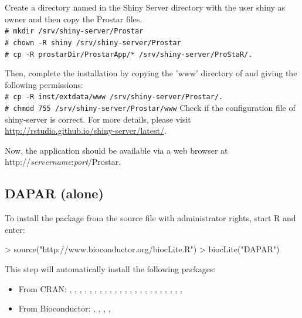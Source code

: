 \documentclass[12pt]{article}
\newcommand{\shellcmd}[1]{\\\indent\indent\texttt{\footnotesize\# #1}}
\begin{document}
Create a directory named  in the Shiny Server directory with the user shiny as owner and then copy the Prostar files.\newline
\shellcmd{mkdir /srv/shiny-server/Prostar}
\shellcmd{chown -R shiny /srv/shiny-server/Prostar}
\shellcmd{cp -R prostarDir/ProstarApp/* /srv/shiny-server/ProStaR/.}

Then, complete the installation by copying the 'www' directory of 
 and giving the following permissions:\newline
\shellcmd{cp -R inst/extdata/www /srv/shiny-server/Prostar/.}
\shellcmd{chmod 755 /srv/shiny-server/Prostar/www}\newline
\newline
Check if the configuration file of shiny-server is correct.\newline
For more details, please visit 
\url{http://rstudio.github.io/shiny-server/latest/}.

Now, the application should be available via a web browser at 
http://\emph{servername}:\emph{port}/Prostar.



\subsection{DAPAR (alone)}\label{sec:daparalone}


To install the package  from the source file with administrator 
rights, start R and enter:

\begin{Schunk}
\begin{Sinput}
> source("http://www.bioconductor.org/biocLite.R")
> biocLite("DAPAR")
\end{Sinput}
\end{Schunk}

This step will automatically install the following packages:
\begin{itemize}
\item {From CRAN}: , , , 
, , , , 
, , , ,
, , , ,
, , , 
, , , , ,
\item {From Bioconductor}: , , 
, , 
\end{itemize}
\end{document}
